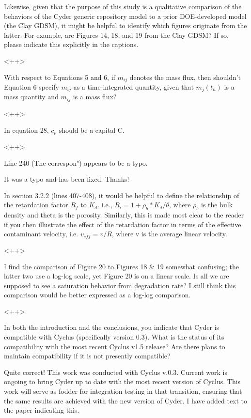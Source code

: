 \documentclass[answers,12pt]{exam}
\begin{document}
\begin{questions}
\question Likewise, given that the purpose of this study is a qualitative comparison of the behaviors of the Cyder generic repository model to a prior DOE-developed model (the Clay GDSM), it might be helpful to identify which figures originate from the latter. For example, are Figures 14, 18, and 19 from the Clay GDSM? If so, please indicate this explicitly in the captions. 
\begin{solution}
<++>
\end{solution}

\question With respect to Equations 5 and 6, if $m_{ij}$ denotes the mass flux, 
then shouldn't Equation 6 specify $m_{ij}$ as a time-integrated quantity, given 
that $m_j(t_n)$ is a mass quantity and $m_{ij}$ is a mass flux?
\begin{solution}
<++>
\end{solution}

\question In equation 28, $c_p$ should be a capital C.
\begin{solution}
<++>
\end{solution}

\question Line 240 (The correspon") appears to be a typo.
\begin{solution}
It was a typo and has been fixed. Thanks!
\end{solution}

\question In section 3.2.2 (lines 407-408), it would be helpful to define the relationship of the retardation factor $R_f$ to $K_d$. i.e., $R_i = 1 + \rho_b 
* K_d / \theta$, where $\rho_b$ is the bulk density and theta is the porosity.  Similarly, this is made most clear to the reader if you then illustrate the effect of the retardation factor in terms of the effective contaminant velocity, i.e. $v_{eff} = v/R$, where v is the average linear velocity.
\begin{solution}
<++>
\end{solution}

\question I find the comparison of Figure 20 to Figures 18 \& 19 somewhat confusing; the latter two use a log-log scale, yet Figure 20 is on a linear scale. Is all we are supposed to see a saturation behavior from degradation rate? I still think this comparison would be better expressed as a log-log comparison.
\begin{solution}
<++>
\end{solution}

\question In both the introduction and the conclusions, you indicate that Cyder is compatible with Cyclus (specifically version 0.3). What is the status of its compatibility with the most recent Cyclus v1.5 release? Are there plans to maintain compatibility if it is not presently compatible?
\begin{solution}
Quite correct! This work was conducted with Cyclus v.0.3. Current work is ongoing to 
bring Cyder up to date with the most recent version of Cyclus. This work will 
serve as fodder for integration testing in that transition, ensuring that the 
same results are achieved with the new version of Cyder. I have added text to 
the paper indicating this.
\end{solution}


\end{questions}
\end{document}
